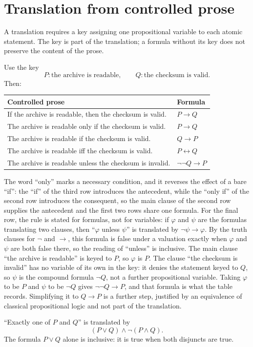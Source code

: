 \section{Translation from controlled prose}
\label{sec:prop-syntax-semantics-03}

A translation requires a key assigning one propositional variable to each
atomic statement.  The key is part of the translation; a formula without its
key does not preserve the content of the prose.

\begin{example}
Use the key
\[
  P:\text{the archive is readable},
  \qquad Q:\text{the checksum is valid}.
\]
Then:
\begin{center}
\begin{tabular}{@{}ll@{}}
\toprule
Controlled prose & Formula \\ \midrule
If the archive is readable, then the checksum is valid. & \(P\to Q\) \\
The archive is readable only if the checksum is valid. & \(P\to Q\) \\
The archive is readable if the checksum is valid. & \(Q\to P\) \\
The archive is readable iff the checksum is valid. & \(P\leftrightarrow Q\) \\
The archive is readable unless the checksum is invalid. & \(\neg\neg Q\to P\) \\
\bottomrule
\end{tabular}
\end{center}
The word ``only'' marks a necessary condition, and it reverses the effect
of a bare ``if'': the ``if'' of the third row introduces the antecedent,
while the ``only if'' of the second row introduces the consequent, so the
main clause of the second row supplies the antecedent and the first two
rows share one formula.
For the final row, the rule is stated for formulas, not for variables: if
\(\varphi\) and \(\psi\) are the formulas translating two clauses, then
``\(\varphi\) unless \(\psi\)'' is translated by \(\neg\psi\to\varphi\).
By the truth clauses for \(\neg\) and \(\to\), this formula is false under
a valuation exactly when \(\varphi\) and \(\psi\) are both false there, so
the reading of ``unless'' is inclusive.  The main clause ``the archive is
readable'' is keyed to \(P\), so \(\varphi\) is \(P\).  The clause ``the
checksum is invalid'' has no variable of its own in the key: it denies the
statement keyed to \(Q\), so \(\psi\) is the compound formula \(\neg Q\),
not a further propositional variable.  Taking \(\varphi\) to be \(P\) and
\(\psi\) to be \(\neg Q\) gives \(\neg\neg Q\to P\), and that formula is
what the table records.  Simplifying it to \(Q\to P\) is a further step,
justified by an equivalence of classical propositional logic and not part of
the translation.
\end{example}

\begin{example}
``Exactly one of \(P\) and \(Q\)'' is translated by
\[
  (P\lor Q)\land\neg(P\land Q).
\]
The formula \(P\lor Q\) alone is inclusive: it is true when both disjuncts are
true.
\end{example}

